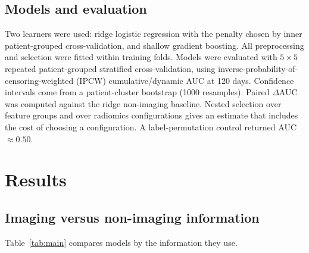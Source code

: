 \documentclass[11pt,a4paper]{article}
\begin{document}
\subsection{Models and evaluation}
Two learners were used: ridge logistic regression with the penalty chosen by inner patient-grouped cross-validation, and
shallow gradient boosting. All preprocessing and selection were fitted within training folds. Models were evaluated with
$5\times5$ repeated patient-grouped stratified cross-validation, using inverse-probability-of-censoring-weighted (IPCW)
cumulative/dynamic AUC at 120 days. Confidence intervals come from a patient-cluster bootstrap (1000 resamples).
Paired $\Delta$AUC was computed against the ridge non-imaging baseline. Nested selection over feature groups and over
radiomics configurations gives an estimate that includes the cost of choosing a configuration. A label-permutation
control returned AUC $\approx 0.50$.

\section{Results}

\subsection{Imaging versus non-imaging information}
Table~\ref{tab:main} compares models by the information they use.
\end{document}
